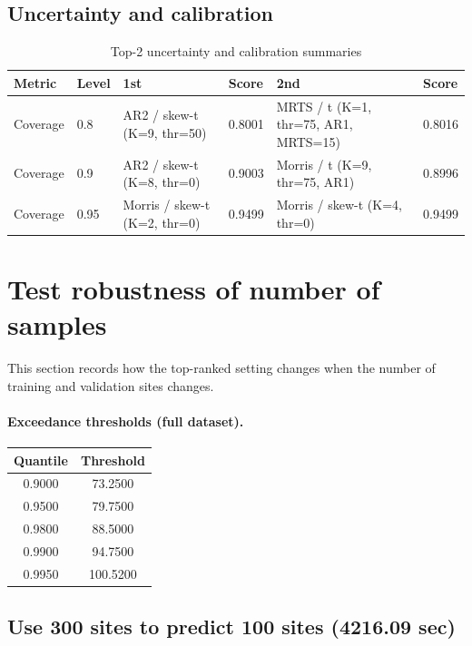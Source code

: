 \documentclass[11pt]{article}
\begin{document}
\clearpage
\subsection{Uncertainty and calibration}

\begin{landscape}
\scriptsize
\begin{longtable}{@{}P{1.6cm}P{1.2cm}P{4cm}P{2.2cm}P{6cm}P{2.2cm}@{}}
\caption{Top-2 uncertainty and calibration summaries}\\
\toprule
Metric & Level & 1st & Score & 2nd & Score \\
\midrule
\endfirsthead
\bottomrule
\endlastfoot
Coverage & 0.8 & AR2 / skew-t (K=9, thr=50) & 0.8001 & MRTS / t (K=1, thr=75, AR1, MRTS=15) & 0.8016 \\
Coverage & 0.9 & AR2 / skew-t (K=8, thr=0) & 0.9003 & Morris / t (K=9, thr=75, AR1) & 0.8996 \\
Coverage & 0.95 & Morris / skew-t (K=2, thr=0) & 0.9499 & Morris / skew-t (K=4, thr=0) & 0.9499 \\
\end{longtable}
\end{landscape}


\clearpage
\section{Test robustness of number of samples}

This section records how the top-ranked setting changes when the number of
training and validation sites changes.

\paragraph{Exceedance thresholds (full dataset).}
\begin{center}
\small
\begin{tabular}{@{}cc@{}}
\toprule
Quantile & Threshold \\
\midrule
0.9000 & 73.2500 \\
0.9500 & 79.7500 \\
0.9800 & 88.5000 \\
0.9900 & 94.7500 \\
0.9950 & 100.5200 \\
\bottomrule
\end{tabular}
\end{center}

\subsection{Use 300 sites to predict 100 sites (4216.09 sec)}
\end{document}
